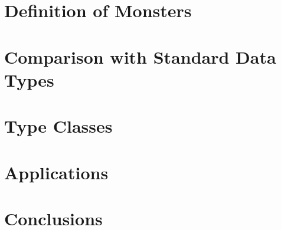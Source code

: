 \documentclass{jfp}
\begin{document}
\section{Definition of Monsters}

\section{Comparison with Standard Data Types}

\section{Type Classes}

\section{Applications}

\section{Conclusions}

\label{lastpage01}
\end{document}
